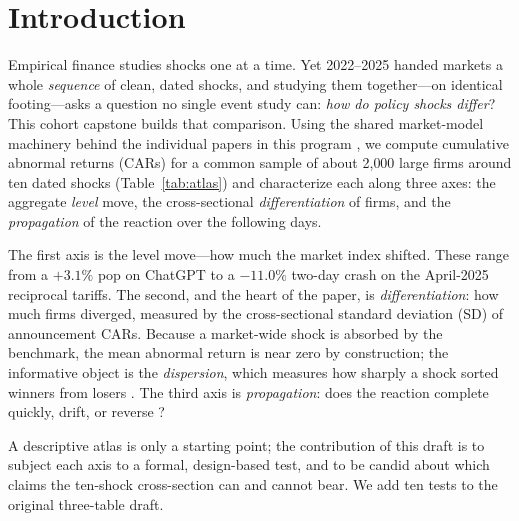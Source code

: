 \documentclass[12pt]{article}
\begin{document}
\newpage
\section{Introduction}
Empirical finance studies shocks one at a time. Yet 2022--2025 handed markets a whole
\emph{sequence} of clean, dated shocks, and studying them together---on identical footing---asks a
question no single event study can: \emph{how do policy shocks differ}? This cohort capstone builds
that comparison. Using the shared market-model machinery behind the individual papers in this
program \citep{fama1970,mackinlay1997,brown1985,campbell1997}, we compute cumulative abnormal
returns (CARs) for a common sample of about 2{,}000 large firms around ten dated shocks
(Table~\ref{tab:atlas}) and characterize each along three axes: the aggregate \emph{level} move,
the cross-sectional \emph{differentiation} of firms, and the \emph{propagation} of the reaction
over the following days.

The first axis is the level move---how much the market index shifted. These range from a $+3.1\%$
pop on ChatGPT to a $-11.0\%$ two-day crash on the April-2025 reciprocal tariffs. The second, and
the heart of the paper, is \emph{differentiation}: how much firms diverged, measured by the
cross-sectional standard deviation (SD) of announcement CARs. Because a market-wide shock is
absorbed by the benchmark, the mean abnormal return is near zero by construction; the informative
object is the \emph{dispersion}, which measures how sharply a shock sorted winners from losers
\citep{roll1988,morck2000}. The third axis is \emph{propagation}: does the reaction complete
quickly, drift, or reverse \citep{bernard1989,debondt1985}?

A descriptive atlas is only a starting point; the contribution of this draft is to subject each
axis to a formal, design-based test, and to be candid about which claims the ten-shock
cross-section can and cannot bear. We add ten tests to the original three-table draft.
\end{document}
